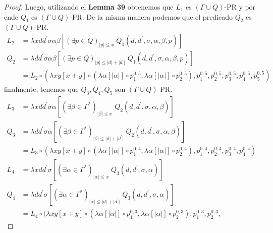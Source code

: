 \begin{proof}
    \PN Luego, utilizando el \textbf{Lemma 39} obtenemos que $L_{1}$ es $(\Gamma \cup Q)$-PR y por ende $Q_{1}$ es
    $(\Gamma \cup Q)$-PR. De la misma manera podemos que el predicado $Q_{2}$ es $(\Gamma \cup Q)$-PR.
    \begin{align*}
      L_2 &= \lambda xdd^{\prime}\sigma\alpha\beta \left[(\exists p \in Q)_{\lvert p \rvert \leq x} \;
             Q_{1}(d,d^{\prime},\sigma,\alpha,\beta,p)\right] \\
      Q_2 &= \lambda dd^{\prime}\sigma\alpha\beta \left[(\exists p \in Q)_{\lvert p \rvert \leq \lvert d \rvert +
             \lvert d^{\prime} \rvert} \; Q_{1}(d,d^{\prime},\sigma,\alpha,\beta,p)\right] \\
          &= L_2 \circ (\lambda xy \left[x + y\right] \circ(\lambda \alpha \left[\lvert\alpha\rvert\right] \circ
             p_{1}^{0,5}, \lambda \alpha \left[\lvert\alpha\rvert\right] \circ p_{2}^{0,5}), p_{1}^{0,5}, p_{2}^{0,5},
             p_{3}^{0,5}, p_{4}^{0,5}, p_{5}^{0,5})
    \end{align*}
    \PN finalmente, tenemos que $Q_{3}, Q_{4}, Q_{5}$ son $(\Gamma \cup Q)$-PR.
    \begin{align*}
      L_3 &= \lambda xdd^{\prime}\sigma\alpha \left[(\exists \beta \in \Gamma^{\ast})_{\lvert\beta\rvert \leq x} \;
             Q_{2}(d,d^{\prime},\sigma,\alpha,\beta)\right] \\
      Q_3 &= \lambda dd^{\prime}\sigma\alpha \left[(\exists \beta \in \Gamma^{\ast})_{\lvert\beta\rvert \leq \lvert d
             \rvert + \lvert d^{\prime} \rvert} \; Q_{2}(d,d^{\prime},\sigma,\alpha,\beta)\right] \\
          &= L_3 \circ (\lambda xy \left[x + y\right] \circ(\lambda \alpha \left[\lvert\alpha\rvert\right] \circ
             p_{1}^{0,4}, \lambda \alpha \left[\lvert\alpha\rvert\right] \circ p_{2}^{0,4}), p_{1}^{0,4}, p_{2}^{0,4},
             p_{3}^{0,4}, p_{4}^{0,4}) \\[10pt]
      L_4 &= \lambda xdd^{\prime}\sigma \left[(\exists \alpha \in \Gamma^{\ast})_{\lvert\alpha\rvert \leq x} \;
             Q_{3}(d,d^{\prime},\sigma,\alpha)\right] \\
      Q_4 &= \lambda dd^{\prime}\sigma \left[(\exists \alpha \in \Gamma^{\ast})_{\lvert\alpha\rvert \leq \lvert d
             \rvert + \lvert d^{\prime} \rvert} \; Q_{3}(d,d^{\prime},\sigma,\alpha)\right] \\
          &= L_4 \circ (\lambda xy \left[x + y\right] \circ(\lambda \alpha \left[\lvert\alpha\rvert\right] \circ
             p_{1}^{0,3}, \lambda \alpha \left[\lvert\alpha\rvert\right] \circ p_{2}^{0,3}), p_{1}^{0,3}, p_{2}^{0,3},

\end{align*}
\end{proof}
